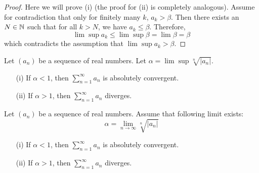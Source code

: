 \documentclass[a4paper]{article}
\begin{document}
\begin{proof}
Here we will prove (i) (the proof for (ii) is completely analogous). Assume for contradiction that only for finitely many \( k  \), \( {a}_{k } > \beta  \). Then there exists an \( N \in \mathbb{N}  \) such that for all \( k > N  \), we have \( {a}_{k } \leq \beta \). Therefore, 
\[  \lim \sup {a}_{k } \leq \lim \sup \beta = \lim \beta = \beta \]
which contradicts the assumption that \( \lim \sup {a}_{k } > \beta \).
\end{proof}

\begin{theorem}
    Let \( ({a}_{n}) \) be a sequence of real numbers. Let \( \alpha = \lim \sup \sqrt[n]{ | {a}_{n} |  }  \). 
    \begin{enumerate}
        \item[(i)] If \( \alpha < 1  \), then \( \sum_{ n=1  }^{ \infty  } {a}_{n} \) is absolutely convergent.
        \item[(ii)] If \( \alpha > 1  \), then \( \sum_{ n=1  }^{ \infty  } {a}_{n} \) diverges.
    \end{enumerate}
\end{theorem}

\begin{theorem}
    Let \( ({a}_{n}) \) be a sequence of real numbers. Assume that following limit exists:
    \[  \alpha = \lim_{ n \to \infty  }  \sqrt[n]{ | {a}_{n} |  } \]
    \begin{enumerate}
        \item[(i)] If \( \alpha < 1  \), then \( \sum_{ n=1  }^{ \infty  } {a}_{n} \) is absolutely convergent.
        \item[(ii)] If \( \alpha > 1  \), then \( \sum_{ n=1  }^{ \infty    } {a}_{n} \) diverges.
    \end{enumerate}
\end{theorem}
\end{document}
